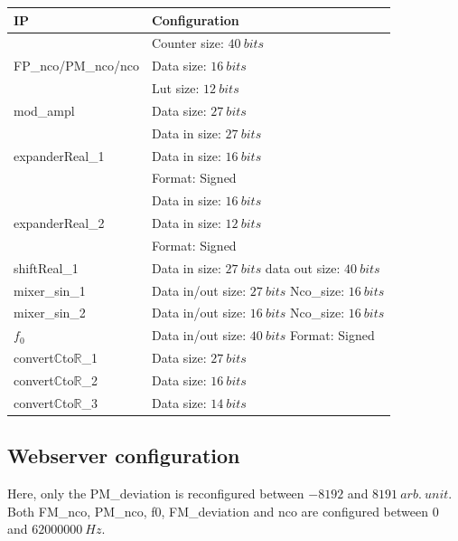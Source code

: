 \documentclass[12pt,oneside]{article}
\begin{document}
\begin{center}
	\begin{tabular}{|>{\centering\arraybackslash}m{.3\linewidth} | >{\centering\arraybackslash}m{.3\linewidth} |}
		\hline
		IP & Configuration \\
		\hline
		& Counter size: $40~bits$\\ FP\_nco/PM\_nco/nco &Data size: $16~bits$\\ &Lut size: $12~bits$ \\
		\hline
		mod\_ampl&Data size: $27~bits$ \\
		\hline
		& Data in size: $27~bits$\\expanderReal\_1 & Data in size: $16~bits$\\ &Format: Signed \\
		\hdashline
		& Data in size: $16~bits$\\expanderReal\_2 & Data in size: $12~bits$\\ &Format: Signed \\
		\hline
		shiftReal\_1&Data in size: $27~bits$ \newline data out size: $40~bits$ \\
		\hline
		mixer\_sin\_1&Data in/out size: $27~bits$ \newline Nco\_size: $16~bits$ \\
		\hdashline
		mixer\_sin\_2&Data in/out size: $16~bits$ \newline Nco\_size: $16~bits$ \\
		\hline
		$f_0$&Data in/out size: $40~bits$ \newline Format: Signed \\
		\hline
		convert$\mathbb{C}$to$\mathbb{R}$\_1&Data size: $27~bits$\\
		\hdashline
		convert$\mathbb{C}$to$\mathbb{R}$\_2&Data size: $16~bits$\\
		\hdashline
		convert$\mathbb{C}$to$\mathbb{R}$\_3&Data size: $14~bits$\\
		\hline
	\end{tabular}
\end{center}

\vspace{0.0cm}
\subsection{Webserver configuration}
\vspace{+0.0cm}

Here, only the PM\_deviation is reconfigured between $-8192$ and $8191~arb.~unit$. Both FM\_nco, PM\_nco, f0, FM\_deviation and nco are configured between $0$ and $62000000~Hz$. 
\end{document}
